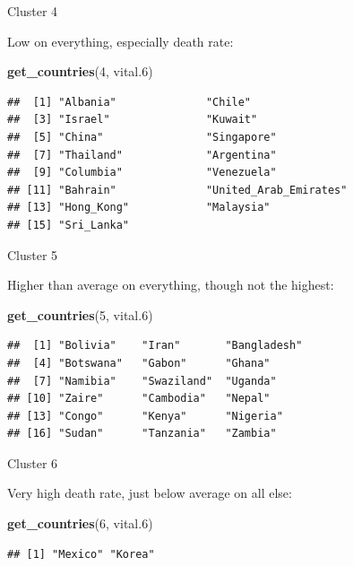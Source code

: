\documentclass[ignorenonframetext,]{beamer}
\newenvironment{Shaded}{\begin{snugshade}}{\end{snugshade}}
\newcommand{\DecValTok}[1]{\textcolor[rgb]{0.00,0.00,0.81}{#1}}
\newcommand{\FloatTok}[1]{\textcolor[rgb]{0.00,0.00,0.81}{#1}}
\newcommand{\KeywordTok}[1]{\textcolor[rgb]{0.13,0.29,0.53}{\textbf{#1}}}
\newcommand{\NormalTok}[1]{#1}
\begin{document}
\begin{frame}[fragile]{Cluster 4}
\protect\hypertarget{cluster-4}{}

Low on everything, especially death rate: \small

\begin{Shaded}
\begin{Highlighting}[]
\KeywordTok{get_countries}\NormalTok{(}\DecValTok{4}\NormalTok{, vital}\FloatTok{.6}\NormalTok{)}
\end{Highlighting}
\end{Shaded}

\begin{verbatim}
##  [1] "Albania"              "Chile"               
##  [3] "Israel"               "Kuwait"              
##  [5] "China"                "Singapore"           
##  [7] "Thailand"             "Argentina"           
##  [9] "Columbia"             "Venezuela"           
## [11] "Bahrain"              "United_Arab_Emirates"
## [13] "Hong_Kong"            "Malaysia"            
## [15] "Sri_Lanka"
\end{verbatim}

\normalsize

\end{frame}

\begin{frame}[fragile]{Cluster 5}
\protect\hypertarget{cluster-5}{}

Higher than average on everything, though not the highest:

\begin{Shaded}
\begin{Highlighting}[]
\KeywordTok{get_countries}\NormalTok{(}\DecValTok{5}\NormalTok{, vital}\FloatTok{.6}\NormalTok{)}
\end{Highlighting}
\end{Shaded}

\begin{verbatim}
##  [1] "Bolivia"    "Iran"       "Bangladesh"
##  [4] "Botswana"   "Gabon"      "Ghana"     
##  [7] "Namibia"    "Swaziland"  "Uganda"    
## [10] "Zaire"      "Cambodia"   "Nepal"     
## [13] "Congo"      "Kenya"      "Nigeria"   
## [16] "Sudan"      "Tanzania"   "Zambia"
\end{verbatim}

\end{frame}

\begin{frame}[fragile]{Cluster 6}
\protect\hypertarget{cluster-6}{}

Very high death rate, just below average on all else:

\begin{Shaded}
\begin{Highlighting}[]
\KeywordTok{get_countries}\NormalTok{(}\DecValTok{6}\NormalTok{, vital}\FloatTok{.6}\NormalTok{)}
\end{Highlighting}
\end{Shaded}

\begin{verbatim}
## [1] "Mexico" "Korea"
\end{verbatim}

\end{frame}
\end{document}
